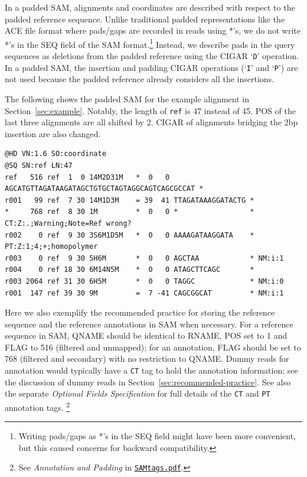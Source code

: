\documentclass[10pt]{article}
\begin{document}
In a padded SAM, alignments and coordinates are described with respect to the
padded reference sequence. Unlike traditional padded representations like
the ACE file format where pads/gaps are recorded in reads using *'s, we do
not write *'s in the {\sf SEQ} field of the SAM format.\footnote{Writing
pads/gaps as *'s in the {\sf SEQ} field might have been more convenient, but
this caused concerns for backward compatibility.} Instead, we describe pads
in the query sequences as deletions from the padded reference using the
{\sf CIGAR} `{\tt D}' operation. In a padded SAM, the insertion and padding
CIGAR operations (`{\tt I}' and `{\tt P}') are not used because the padded
reference already considers all the insertions.

The following shows the padded SAM for the example alignment in Section~\ref{sec:example}.
Notably, the length of {\tt ref} is 47 instead of 45. {\sf POS} of the last
three alignments are all shifted by 2. {\sf CIGAR} of alignments bridging the
2bp insertion are also changed.

\begin{framed}\small
\begin{verbatim}
@HD VN:1.6 SO:coordinate
@SQ SN:ref LN:47
ref   516 ref  1  0 14M2D31M   *  0   0 AGCATGTTAGATAAGATAGCTGTGCTAGTAGGCAGTCAGCGCCAT *
r001   99 ref  7 30 14M1D3M    = 39  41 TTAGATAAAGGATACTG *
*     768 ref  8 30 1M         *  0   0 *                 * CT:Z:.;Warning;Note=Ref wrong?
r002    0 ref  9 30 3S6M1D5M   *  0   0 AAAAGATAAGGATA    * PT:Z:1;4;+;homopolymer
r003    0 ref  9 30 5H6M       *  0   0 AGCTAA            * NM:i:1
r004    0 ref 18 30 6M14N5M    *  0   0 ATAGCTTCAGC       *
r003 2064 ref 31 30 6H5M       *  0   0 TAGGC             * NM:i:0
r001  147 ref 39 30 9M         =  7 -41 CAGCGGCAT         * NM:i:1
\end{verbatim}
\end{framed}

Here we also exemplify the recommended practice for storing the reference
sequence and the reference annotations in SAM when necessary. For a reference
sequence in SAM, {\sf QNAME} should be identical to {\sf RNAME}, {\sf POS} set
to 1 and {\sf FLAG} to 516 (filtered and unmapped); for an annotation, {\sf
FLAG} should be set to 768 (filtered and secondary) with no restriction to {\sf
QNAME}.
Dummy reads for annotation would typically have a {\tt CT} tag to hold the annotation information; see the discussion of dummy reads in Section~\ref{sec:recommended-practice}.
See also the separate {\sl Optional Fields Specification} for full details of the {\tt CT} and {\tt PT} annotation tags.%
\footnote{See \emph{Annotation and Padding} in \href{http://samtools.github.io/hts-specs/SAMtags.pdf}{\tt SAMtags.pdf}.}
\end{document}
